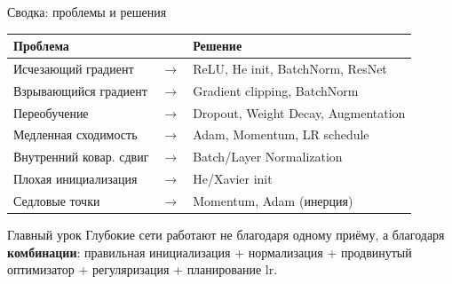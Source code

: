 \documentclass[aspectratio=169, 9pt]{beamer}
\begin{document}
\begin{frame}{Сводка: проблемы и решения}
  \centering
  \begin{tabular}{lcl}
    \toprule
    \textbf{Проблема} & & \textbf{Решение} \\
    \midrule
    Исчезающий градиент & $\longrightarrow$ & ReLU, He init, BatchNorm, ResNet \\
    Взрывающийся градиент & $\longrightarrow$ & Gradient clipping, BatchNorm \\
    Переобучение & $\longrightarrow$ & Dropout, Weight Decay, Augmentation \\
    Медленная сходимость & $\longrightarrow$ & Adam, Momentum, LR schedule \\
    Внутренний ковар. сдвиг & $\longrightarrow$ & Batch/Layer Normalization \\
    Плохая инициализация & $\longrightarrow$ & He/Xavier init \\
    Седловые точки & $\longrightarrow$ & Momentum, Adam (инерция) \\
    \bottomrule
  \end{tabular}
  
  \vspace{1em}
  \begin{block}{Главный урок}
    Глубокие сети работают не благодаря одному приёму, а благодаря \textbf{комбинации}: правильная инициализация + нормализация + продвинутый оптимизатор + регуляризация + планирование lr.
  \end{block}
\end{frame}
\end{document}
